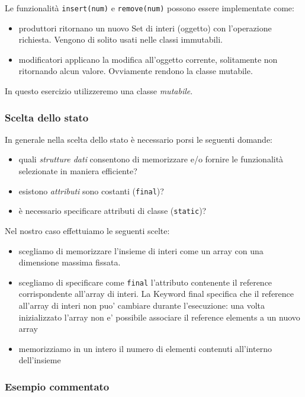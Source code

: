 \documentclass{article}
\begin{document}
Le funzionalit\`a \texttt{insert(num)} e \texttt{remove(num)} possono essere implementate come:
\begin{itemize}
	\item produttori ritornano un nuovo Set di interi (oggetto) con l'operazione richiesta. Vengono di solito usati nelle classi immutabili.
	\item modificatori applicano la modifica all'oggetto corrente, solitamente non ritornando alcun valore. Ovviamente rendono la classe mutabile.
\end{itemize}
In questo esercizio utilizzeremo una classe \emph{mutabile}.

\subsubsection{Scelta dello stato}
In generale nella scelta dello stato \`e necessario porsi le seguenti domande:
\begin{itemize}
\item quali \emph{strutture dati} consentono di memorizzare e/o fornire le funzionalit\`a selezionate in maniera efficiente?
\item esistono \emph{attributi} sono costanti (\texttt{final})?
\item \`e necessario specificare attributi di classe (\texttt{static})?
\end{itemize}

Nel nostro caso effettuiamo le seguenti scelte:
\begin{itemize}
\item scegliamo di memorizzare l'insieme di interi come un array con una dimensione massima fissata.
\item scegliamo di specificare come \texttt{final} l'attributo contenente il reference corrispondente all'array di interi. La Keyword final specifica che il reference all'array di interi non puo' cambiare durante l'esecuzione: una volta inizializzato l'array non e' possibile associare il reference elements a un nuovo array 
\item memorizziamo in un intero il numero di elementi contenuti all'interno dell'insieme
\end{itemize}


\subsubsection{Esempio commentato}

\end{document}
